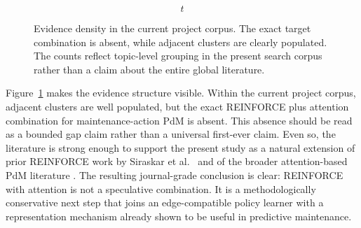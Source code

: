 \begin{figure}\[t\] \centering {} \caption{Evidence density in the current project corpus. The exact target combination is absent, while adjacent clusters are clearly populated. The counts reflect topic-level grouping in the present search corpus rather than a claim about the entire global literature.} \label{fig:evidence_sparsity} \end{figure}

Figure~\ref{fig:evidence_sparsity} makes the evidence structure visible. Within the current project corpus, adjacent clusters are well populated, but the exact REINFORCE plus attention combination for maintenance-action PdM is absent. This absence should be read as a bounded gap claim rather than a universal first-ever claim. Even so, the literature is strong enough to support the present study as a natural extension of prior REINFORCE work by Siraskar et al. \cite{Sir25} and of the broader attention-based PdM literature \cite{Luc23,Zha23d}. The resulting journal-grade conclusion is clear: REINFORCE with attention is not a speculative combination. It is a methodologically conservative next step that joins an edge-compatible policy learner with a representation mechanism already shown to be useful in predictive maintenance.
